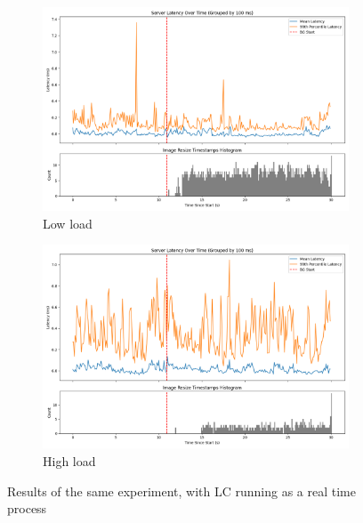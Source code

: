 \begin{figure}[t]
    \centering
    \begin{subfigure}[t]{0.48\textwidth}
        \includegraphics[width=\textwidth]{graphs/unedited-rt-low-two.png}
        \caption{Low load}\label{fig:unedited-rt-low-two}
    \end{subfigure}
    \hspace{\fill}
    \begin{subfigure}[t]{0.48\textwidth}
        \includegraphics[width=\textwidth]{graphs/unedited-rt-high-two.png}
        \caption{High load}\label{fig:unedited-rt-high-two}
    \end{subfigure}
    \caption{Results of the same experiment, with LC running as a real time process}\label{fig:unedited-rt}
\end{figure}

